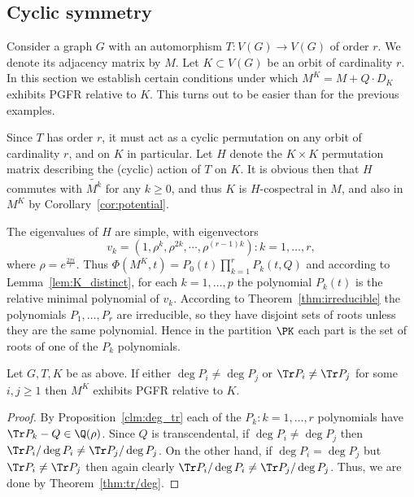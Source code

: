 \subsection{Cyclic symmetry}

\newcommand{\ord}{r}

Consider a graph $G$ with an automorphism $T : V(G) \to V(G)$ of order $\ord$. We denote its adjacency matrix by $M$. Let $K \subset V(G)$ be an orbit of cardinality $\ord$. In this section we establish certain conditions under which $M^K = M + Q \cdot D_K$ exhibits PGFR relative to $K$. This turns out to be easier than for the previous examples.

Since $T$ has order $\ord$, it must act as a cyclic permutation on any orbit of cardinality $\ord$, and on $K$ in particular. Let $H$ denote the $K \times K$ permutation matrix describing the (cyclic) action of $T$ on $K$. It is obvious then that $H$ commutes with $\widetilde{M^k}$ for any $k \geq 0$, and thus $K$ is $H$-cospectral in $M$, and also in $M^K$ by Corollary~\ref{cor:potential}.  
 
 The eigenvalues of $H$ are simple, with eigenvectors 
 \begin{equation}\label{eq:vk}
 v_k = (1,\rho^k, \rho^{2k}, \cdots, \rho^{(\ord-1)k})  : k = 1,\dots, \ord, 
 \end{equation} 
 where $\rho = e^{\frac{2\pi i}{\ord}}$. Thus $\Phi(M^K,t) = P_0(t) \prod_{k=1}^{\ord} P_k(t,Q)$ and according to Lemma~\ref{lem:K_distinct}, for each $k=1, \dots, p$ the polynomial $P_k(t)$ is the relative minimal polynomial of $v_k$. According to Theorem~\ref{thm:irreducible} the polynomials $P_1, \dots, P_{\ord}$ are irreducible, so they have disjoint sets of roots unless they are the same polynomial. Hence in the partition $\PK$ each part is the set of roots of one of the $P_k$ polynomials. 

\begin{lemma}\label{lem:main_cyclic}
Let $G,T,K$ be as above. If either $\deg P_i \neq \deg P_j$ or $\Tr P_i \neq \Tr P_j$ for some $i,j \geq 1$ then $M^K$ exhibits PGFR relative to $K$.
\end{lemma}

\begin{proof}
By Proposition~\ref{clm:deg_tr} each of the $P_k : k =1,\dots, \ord$ polynomials have $\Tr P_k - Q \in \Q(\rho)$. Since $Q$ is transcendental, if $\deg P_i \neq \deg P_j$ then $\Tr P_i / \deg P_i \neq \Tr P_j / \deg P_j$. On the other hand, if $\deg P_i =\deg P_j$ but $\Tr P_i \neq \Tr P_j$ then again clearly $\Tr P_i / \deg P_i \neq \Tr P_j / \deg P_j$. Thus, we are done by Theorem~\ref{thm:tr/deg}.
\end{proof}

